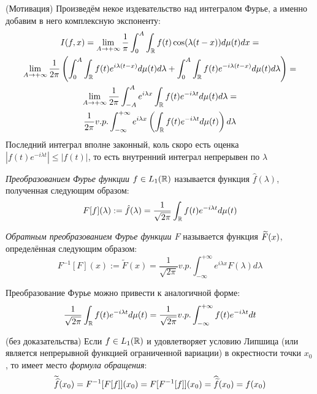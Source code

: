 \begin{note} (Мотивация)
	Произведём некое издевательство над интегралом Фурье, а именно добавим в него комплексную экспоненту:
	\begin{multline*}
		I(f, x) = \lim_{A \to +\infty} \frac{1}{\pi} \int_0^A \int_{\mathbb{R}} f(t)\cos(\lambda(t - x))d\mu(t)dx =
		\\
		\lim_{A \to +\infty} \frac{1}{2\pi} \left(\int_0^A \int_{\mathbb{R}} f(t)e^{i\lambda(t - x)}d\mu(t)d\lambda + \int_0^A \int_{\mathbb{R}} f(t)e^{-i\lambda(t - x)}d\mu(t)d\lambda\right) =
		\\
		\lim_{A \to +\infty} \frac{1}{2\pi} \int_{-A}^A e^{i\lambda x} \int_{\mathbb{R}} f(t)e^{-i\lambda t}d\mu(t)d\lambda =
		\\
		\frac{1}{2\pi} v.p. \int_{-\infty}^{+\infty} e^{i\lambda x}\left(\int_{\mathbb{R}} f(t)e^{-i\lambda t}d\mu(t)\right)d\lambda
	\end{multline*}
	Последний интеграл вполне законный, коль скоро есть оценка $|f(t)e^{-i\lambda t}| \le |f(t)|$, то есть внутренний интеграл непрерывен по $\lambda$
\end{note}

\begin{definition}
	\textit{Преобразованием Фурье функции $f \in L_1(\mathbb{R})$} называется функция $\hat{f}(\lambda)$, полученная следующим образом:
	\[
		F[f](\lambda) := \hat{f}(\lambda) = \frac{1}{\sqrt{2\pi}} \int_{\mathbb{R}} f(t)e^{-i\lambda t}d\mu(t)
	\]
\end{definition}

\begin{definition}
	\textit{Обратным преобразованием Фурье функции $F$} называется функция $\widetilde{F}(x)$, определённая следующим образом:
	\[
		F^{-1}[F](x) := \widetilde{F}(x) = \frac{1}{\sqrt{2\pi}} v.p. \int_{-\infty}^{+\infty} e^{i\lambda x}F(\lambda)d\lambda
	\]
\end{definition}

\begin{note}
	Преобразование Фурье можно привести к аналогичной форме:
	\[
		\frac{1}{\sqrt{2\pi}} \int_{\mathbb{R}} f(t)e^{-i\lambda t}d\mu(t) = \frac{1}{\sqrt{2\pi}} v.p. \int_{-\infty}^{+\infty} f(t)e^{-i\lambda t}dt
	\]
\end{note}

\begin{proposition} (без доказательства)
	Если $f \in L_1(\mathbb{R})$ и удовлетворяет условию Липшица (или является непрерывной функцией ограниченной вариации) в окрестности точки $x_0$, то имеет место \textit{формула обращения}:
	\[
		\widetilde{\widehat{f}}(x_0) = F^{-1}[F[f]](x_0) = F[F^{-1}[f]](x_0) = \widehat{\widetilde{f}}(x_0) = f(x_0)
	\]
\end{proposition}

